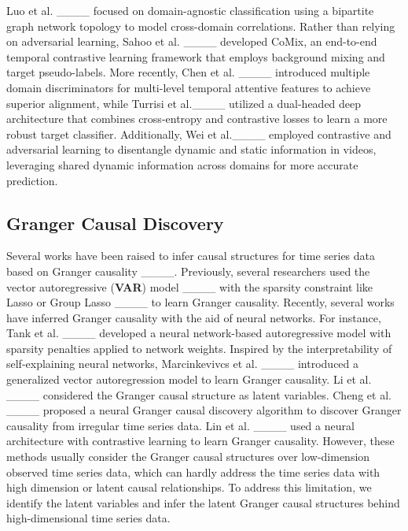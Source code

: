 Luo et al. ____ focused on domain-agnostic classification using a bipartite graph network topology to model cross-domain correlations. Rather than relying on adversarial learning, Sahoo et al. ____ developed CoMix, an end-to-end temporal contrastive learning framework that employs background mixing and target pseudo-labels. More recently, Chen et al. ____ introduced multiple domain discriminators for multi-level temporal attentive features to achieve superior alignment, while Turrisi et al.____ utilized a dual-headed deep architecture that combines cross-entropy and contrastive losses to learn a more robust target classifier. Additionally, Wei et al.____ employed contrastive and adversarial learning to disentangle dynamic and static information in videos, leveraging shared dynamic information across domains for more accurate prediction.


\subsection{Granger Causal Discovery}
Several works have been raised to infer causal structures for time series data based on Granger causality ____. Previously, several researchers used the vector autoregressive (\textbf{VAR}) model ____ with the sparsity constraint like Lasso or Group Lasso ____ to learn Granger causality. Recently, several works have inferred Granger causality with the aid of neural networks. For instance, Tank et al. ____ developed a neural network-based autoregressive model with sparsity penalties applied to network weights. Inspired by the interpretability of self-explaining neural networks, Marcinkevivcs et al. ____ introduced a generalized vector autoregression model to learn Granger causality. Li et al. ____ considered the Granger causal structure as latent variables. Cheng et al. ____ proposed a neural Granger causal discovery algorithm to discover Granger causality from irregular time series data. Lin et al. ____ used a neural architecture with contrastive learning to learn Granger causality. However, these methods usually consider the Granger causal structures over low-dimension observed time series data, which can hardly address the time series data with high dimension or latent causal relationships. To address this limitation, we identify the latent variables and infer the latent Granger causal structures behind high-dimensional time series data.

